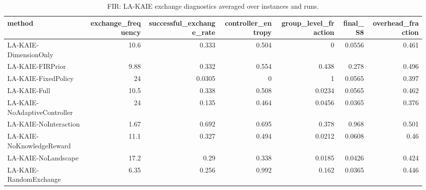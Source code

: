 \begin{table}[t]
\centering
\scriptsize
\caption{FIR: LA-KAIE exchange diagnostics averaged over instances and runs.}
\label{tab:fir_exchange}
\begin{tabular}{lrrrrrr}
\toprule
method & exchange\_frequency & successful\_exchange\_rate & controller\_entropy & group\_level\_fraction & final\_S8 & overhead\_fraction \\
\midrule
LA-KAIE-DimensionOnly & 10.6 & 0.333 & 0.504 & 0 & 0.0556 & 0.461 \\
LA-KAIE-FIRPrior & 9.88 & 0.332 & 0.554 & 0.438 & 0.278 & 0.496 \\
LA-KAIE-FixedPolicy & 24 & 0.0305 & 0 & 1 & 0.0565 & 0.397 \\
LA-KAIE-Full & 10.5 & 0.338 & 0.508 & 0.0234 & 0.0565 & 0.462 \\
LA-KAIE-NoAdaptiveController & 24 & 0.135 & 0.464 & 0.0456 & 0.0365 & 0.376 \\
LA-KAIE-NoInteraction & 1.67 & 0.692 & 0.695 & 0.378 & 0.968 & 0.501 \\
LA-KAIE-NoKnowledgeReward & 11.1 & 0.327 & 0.494 & 0.0212 & 0.0608 & 0.46 \\
LA-KAIE-NoLandscape & 17.2 & 0.29 & 0.338 & 0.0185 & 0.0426 & 0.424 \\
LA-KAIE-RandomExchange & 6.35 & 0.256 & 0.992 & 0.162 & 0.0365 & 0.446 \\
\bottomrule
\end{tabular}
\end{table}

